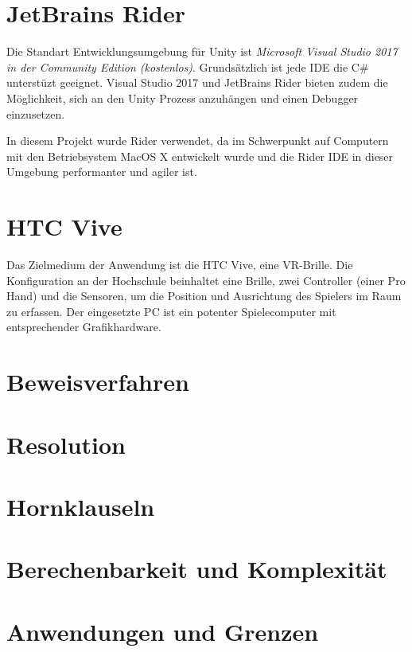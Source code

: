 \section{JetBrains Rider}
\label{Rider}
Die Standart Entwicklungsumgebung für Unity ist \emph{Microsoft Visual Studio 2017 in der Community Edition (kostenlos)}. Grundsätzlich ist jede IDE die C\# unterstüzt geeignet. Visual Studio 2017 und JetBrains Rider bieten zudem die Möglichkeit, sich an den Unity Prozess anzuhängen und einen Debugger einzusetzen. 

In diesem Projekt wurde Rider verwendet, da im Schwerpunkt auf Computern mit den Betriebsystem MacOS X entwickelt wurde und die Rider IDE in dieser Umgebung performanter und agiler ist.


\section{HTC Vive}
\label{Vive}
Das Zielmedium der Anwendung ist die HTC Vive, eine VR-Brille. Die Konfiguration an der Hochschule beinhaltet eine Brille, zwei Controller (einer Pro Hand) und die Sensoren, um die Position und Ausrichtung des Spielers im Raum zu erfassen. 
Der eingesetzte PC ist ein potenter Spielecomputer mit entsprechender Grafikhardware.

 

\section{Beweisverfahren}
\label{Beweisverfahren}

\section{Resolution}
\label{Resolution_aussage}


\section{Hornklauseln}
\label{Hornklauseln}



\section{Berechenbarkeit und Komplexität}


\section{Anwendungen und Grenzen}
\